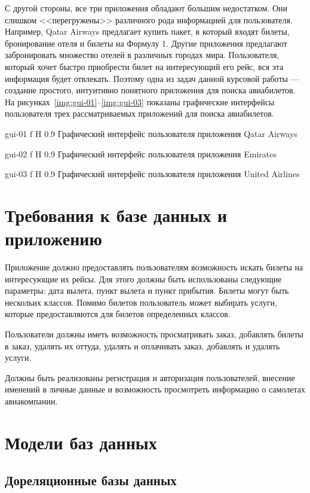 \documentclass{bmstu}
\begin{document}
С другой стороны, все три приложения обладают большим недостатком. 
Они слишком <<перегружены>> различного рода информацией для пользователя. 
Например, Qatar Airways предлагает купить пакет, в который входят билеты, бронирование отеля и билеты на Формулу 1. 
Другие приложения предлагают забронировать множество отелей в различных городах мира. 
Пользователя, который хочет быстро приобрести билет на интересующий его рейс, вся эта информация будет отвлекать. 
Поэтому одна из задач данной курсовой работы --- создание простого, интуитивно понятного приложения для поиска авиабилетов. 
На рисунках~\ref{img:gui-01}--\ref{img:gui-03} показаны графические интерфейсы пользователя трех рассматриваемых приложений для поиска авиабилетов.

    {gui-01}
    {f}
    {H}
    {0.9\textwidth}
    {Графический интерфейс пользователя приложения Qatar Airways}
    
    {gui-02}
    {f}
    {H}
    {0.9\textwidth}
    {Графический интерфейс пользователя приложения Emirates}
    
    {gui-03}
    {f}
    {H}
    {0.9\textwidth}
    {Графический интерфейс пользователя приложения United Airlines}

\section{Требования к базе данных и приложению}

Приложение должно предоставлять пользователям возможность искать билеты на интересующие их рейсы. 
Для этого должны быть использованы следующие параметры: дата вылета, пункт вылета и пункт прибытия. 
Билеты могут быть нескольих классов. 
Помимо билетов пользователь может выбирать услуги, которые предоставляются для билетов определенных классов.

Пользователи должны иметь возможность просматривать заказ, добавлять билеты в заказ, удалять их оттуда, удалять и оплачивать заказ, добавлять и удалять услуги.
 
Должны быть реализованы регистрация и авторизация пользователей, внесение именений в личные данные и возможность просмотреть информацию о самолетах авиакомпании.

\section{Модели баз данных}

\subsection{Дореляционные базы данных}
\end{document}
